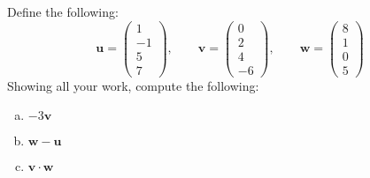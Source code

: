 \documentclass[11pt,letterpaper]{article}
\begin{document}

 Define the following:
	\[
	\mathbf{u}= \begin{pmatrix} 1 \\ -1 \\ 5 \\ 7 \end{pmatrix}, \qquad
	\mathbf{v}= \begin{pmatrix} 0 \\ 2 \\ 4 \\ -6 \end{pmatrix}, \qquad
	\mathbf{w}= \begin{pmatrix} 8 \\ 1 \\ 0 \\5 \end{pmatrix}
	\]
Showing all your work, compute the following:
	\begin{enumerate}[(a)]
	\item $-3\mathbf{v}$
	\item $\mathbf{w} - \mathbf{u}$
	\item $\mathbf{v} \cdot \mathbf{w}$
	\end{enumerate} \pspace
\end{document}
